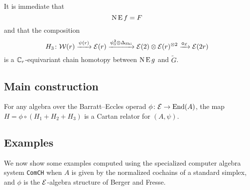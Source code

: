 It is immediate that
\[
\operatorname{N}\operatorname{E} f = F
\]
and that the composition
\[
H_3 \colon \mathcal{W}(r) \xrightarrow{\psi(r)} \mathcal{E}(r) \xrightarrow{\psi^2_0 \otimes \Delta_{\operatorname{Shi}}} \mathcal{E}(2) \otimes \mathcal{E}(r)^{\otimes 2} \xrightarrow{\bm{\circ}_{\mathcal{E}}} \mathcal{E}(2r)
\]
is a $\mathbb{C}_r$-equivariant chain homotopy between $\operatorname{N}\operatorname{E} g$ and $\widetilde G$.

\subsection{Main construction}

\begin{theorem}
	For any algebra over the Barratt--Eccles operad $\phi \colon \mathcal{E} \to \mathrm{End}(A)$, the map $H = \phi \circ (H_1 + H_2 + H_3)$ is a Cartan relator for $(A,\psi)$.
\end{theorem}

\subsection{Examples}

We now show some examples computed using the specialized computer algebra system \texttt{ComCH} \cite{medina2021comch} when $A$ is given by the normalized cochains of a standard simplex, and $\phi$ is the $\mathcal{E}$-algebra structure of Berger and Fresse.
